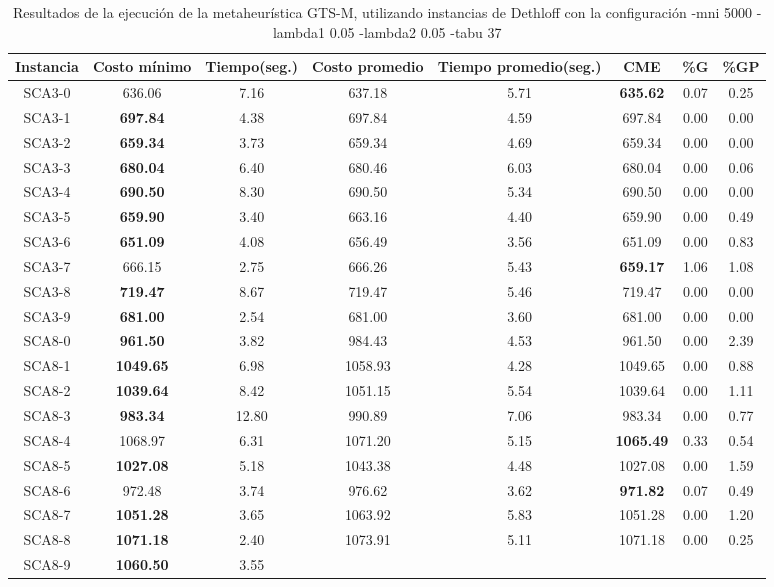 \begin{table}[h]
\caption{Resultados de la ejecución de la metaheurística GTS-M, utilizando instancias de Dethloff con la configuración -mni 5000 -lambda1 0.05 -lambda2 0.05 -tabu 37}
\centering
\small
\begin{tabular}{c c c c c c c c}
\hline\hline
Instancia & Costo mínimo & Tiempo(seg.) & Costo promedio & Tiempo promedio(seg.) & CME & \%G & \%GP \\ [0.5ex]
\hline
SCA3-0 & 636.06 & 7.16 & 
637.18 & 5.71 & \bf{635.62} & 
0.07 & 0.25\\SCA3-1 & \bf{697.84} & 4.38 & 
697.84 & 4.59 & 697.84 & 0.00
 & 0.00\\
SCA3-2 & \bf{659.34} & 3.73 & 
659.34 & 4.69 & 659.34 & 0.00
 & 0.00\\
SCA3-3 & \bf{680.04} & 6.40 & 
680.46 & 6.03 & 680.04 & 0.00
 & 0.06\\SCA3-4 & \bf{690.50} & 8.30 & 
690.50 & 5.34 & 690.50 & 0.00
 & 0.00\\
SCA3-5 & \bf{659.90} & 3.40 & 
663.16 & 4.40 & 659.90 & 0.00
 & 0.49\\SCA3-6 & \bf{651.09} & 4.08 & 
656.49 & 3.56 & 651.09 & 0.00
 & 0.83\\SCA3-7 & 666.15 & 2.75 & 
666.26 & 5.43 & \bf{659.17} & 
1.06 & 1.08\\SCA3-8 & \bf{719.47} & 8.67 & 
719.47 & 5.46 & 719.47 & 0.00
 & 0.00\\
SCA3-9 & \bf{681.00} & 2.54 & 
681.00 & 3.60 & 681.00 & 0.00
 & 0.00\\
SCA8-0 & \bf{961.50} & 3.82 & 
984.43 & 4.53 & 961.50 & 0.00
 & 2.39\\SCA8-1 & \bf{1049.65} & 6.98 & 
1058.93 & 4.28 & 1049.65 & 0.00
 & 0.88\\SCA8-2 & \bf{1039.64} & 8.42 & 
1051.15 & 5.54 & 1039.64 & 0.00
 & 1.11\\SCA8-3 & \bf{983.34} & 12.80 & 
990.89 & 7.06 & 983.34 & 0.00
 & 0.77\\SCA8-4 & 1068.97 & 6.31 & 
1071.20 & 5.15 & \bf{1065.49} & 
0.33 & 0.54\\SCA8-5 & \bf{1027.08} & 5.18 & 
1043.38 & 4.48 & 1027.08 & 0.00
 & 1.59\\SCA8-6 & 972.48 & 3.74 & 
976.62 & 3.62 & \bf{971.82} & 
0.07 & 0.49\\SCA8-7 & \bf{1051.28} & 3.65 & 
1063.92 & 5.83 & 1051.28 & 0.00
 & 1.20\\SCA8-8 & \bf{1071.18} & 2.40 & 
1073.91 & 5.11 & 1071.18 & 0.00
 & 0.25\\SCA8-9 & \bf{1060.50} & 3.55 & 

\end{tabular}
\end{table}
